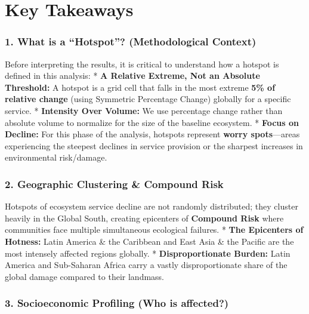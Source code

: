 \documentclass[
  letterpaper,
  DIV=11,
  numbers=noendperiod]{scrreprt}
\begin{document}

\chapter*{Key Takeaways}\label{key-takeaways}


\subsection*{1. What is a ``Hotspot''? (Methodological
Context)}\label{what-is-a-hotspot-methodological-context}

Before interpreting the results, it is critical to understand how a
hotspot is defined in this analysis: * \textbf{A Relative Extreme, Not
an Absolute Threshold:} A hotspot is a grid cell that falls in the most
extreme \textbf{5\% of relative change} (using Symmetric Percentage
Change) globally for a specific service. * \textbf{Intensity Over
Volume:} We use percentage change rather than absolute volume to
normalize for the size of the baseline ecosystem. * \textbf{Focus on
Decline:} For this phase of the analysis, hotspots represent
\textbf{worry spots}---areas experiencing the steepest declines in
service provision or the sharpest increases in environmental
risk/damage.

\subsection*{2. Geographic Clustering \& Compound
Risk}\label{geographic-clustering-compound-risk}

Hotspots of ecosystem service decline are not randomly distributed; they
cluster heavily in the Global South, creating epicenters of
\textbf{Compound Risk} where communities face multiple simultaneous
ecological failures. * \textbf{The Epicenters of Hotness:} Latin America
\& the Caribbean and East Asia \& the Pacific are the most intensely
affected regions globally. * \textbf{Disproportionate Burden:} Latin
America and Sub-Saharan Africa carry a vastly disproportionate share of
the global damage compared to their landmass.

\subsection*{3. Socioeconomic Profiling (Who is
affected?)}\label{socioeconomic-profiling-who-is-affected}
\end{document}
